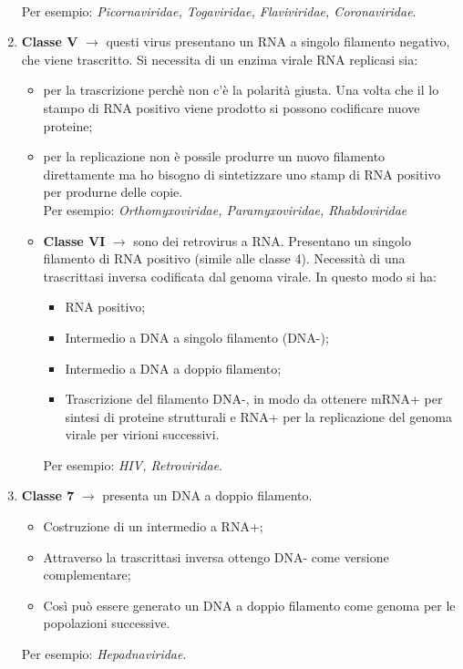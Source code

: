 \begin{enumerate}
    \\Per esempio: \textit{Picornaviridae, Togaviridae, Flaviviridae, Coronaviridae}.
    \item \textbf{Classe V} $\xrightarrow{}$ questi virus presentano un RNA a singolo filamento negativo, che viene trascritto. Si necessita di un enzima virale RNA replicasi sia: 
    \begin{itemize}
        \item per la trascrizione perch\`e non c'\`e la polarit\`a giusta. Una volta che il lo stampo di RNA positivo viene prodotto si possono codificare nuove proteine; 
        \item per la replicazione non \`e possile produrre un nuovo filamento direttamente ma ho bisogno di sintetizzare uno stamp di RNA positivo per produrne delle copie. 
        \\Per esempio: \textit{Orthomyxoviridae, Paramyxoviridae, Rhabdoviridae}
        \item \textbf{Classe VI} $\xrightarrow{}$ sono dei retrovirus a RNA. Presentano un singolo filamento di RNA positivo (simile alle classe 4). Necessit\`a di una trascrittasi inversa codificata dal genoma virale. In questo modo si ha: 
        \begin{itemize}
            \item RNA positivo; 
            \item Intermedio a DNA a singolo filamento (DNA-); 
            \item Intermedio a DNA a doppio filamento; 
            \item Trascrizione del filamento DNA-, in modo da ottenere mRNA+ per sintesi di proteine strutturali e RNA+ per la replicazione del genoma virale per virioni successivi.
        \end{itemize}
        Per esempio: \textit{HIV, Retroviridae}.
    \end{itemize}
    \item \textbf{Classe 7} $\xrightarrow{}$ presenta un DNA a doppio filamento.
    \begin{itemize}
        \item Costruzione di un intermedio a RNA+; 
        \item Attraverso la trascrittasi inversa ottengo DNA- come versione complementare; 
        \item Cos\`i pu\`o essere generato un DNA a doppio filamento come genoma per le popolazioni successive.
    \end{itemize}
    Per esempio: \textit{Hepadnaviridae}.
\end{enumerate}
